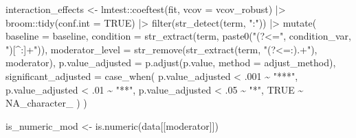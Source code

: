\documentclass[
  letterpaper,
  DIV=11,
  numbers=noendperiod]{scrartcl}
\newenvironment{Shaded}{\begin{snugshade}}{\end{snugshade}}
\newcommand{\AttributeTok}[1]{\textcolor[rgb]{0.40,0.45,0.13}{#1}}
\newcommand{\ConstantTok}[1]{\textcolor[rgb]{0.56,0.35,0.01}{#1}}
\newcommand{\DecValTok}[1]{\textcolor[rgb]{0.68,0.00,0.00}{#1}}
\newcommand{\FunctionTok}[1]{\textcolor[rgb]{0.28,0.35,0.67}{#1}}
\newcommand{\NormalTok}[1]{\textcolor[rgb]{0.00,0.23,0.31}{#1}}
\newcommand{\OtherTok}[1]{\textcolor[rgb]{0.00,0.23,0.31}{#1}}
\newcommand{\SpecialCharTok}[1]{\textcolor[rgb]{0.37,0.37,0.37}{#1}}
\newcommand{\StringTok}[1]{\textcolor[rgb]{0.13,0.47,0.30}{#1}}
\begin{document}
\begin{Shaded}
\begin{Highlighting}[]
\NormalTok{  interaction\_effects }\OtherTok{\textless{}{-}}\NormalTok{ lmtest}\SpecialCharTok{::}\FunctionTok{coeftest}\NormalTok{(fit, }\AttributeTok{vcov =}\NormalTok{ vcov\_robust) }\SpecialCharTok{|\textgreater{}}
\NormalTok{    broom}\SpecialCharTok{::}\FunctionTok{tidy}\NormalTok{(}\AttributeTok{conf.int =} \ConstantTok{TRUE}\NormalTok{) }\SpecialCharTok{|\textgreater{}}
    \FunctionTok{filter}\NormalTok{(}\FunctionTok{str\_detect}\NormalTok{(term, }\StringTok{":"}\NormalTok{)) }\SpecialCharTok{|\textgreater{}}
    \FunctionTok{mutate}\NormalTok{(}
      \AttributeTok{baseline             =}\NormalTok{ baseline,}
      \AttributeTok{condition            =} \FunctionTok{str\_extract}\NormalTok{(term, }\FunctionTok{paste0}\NormalTok{(}\StringTok{"(?\textless{}="}\NormalTok{, condition\_var, }\StringTok{")[\^{}:]+"}\NormalTok{)),}
      \AttributeTok{moderator\_level      =} \FunctionTok{str\_remove}\NormalTok{(}\FunctionTok{str\_extract}\NormalTok{(term, }\StringTok{"(?\textless{}=:).+"}\NormalTok{), moderator),}
      \AttributeTok{p.value\_adjusted     =} \FunctionTok{p.adjust}\NormalTok{(p.value, }\AttributeTok{method =}\NormalTok{ adjust\_method),}
      \AttributeTok{significant\_adjusted =} \FunctionTok{case\_when}\NormalTok{(}
\NormalTok{        p.value\_adjusted }\SpecialCharTok{\textless{}}\NormalTok{ .}\DecValTok{001} \SpecialCharTok{\textasciitilde{}} \StringTok{"***"}\NormalTok{,}
\NormalTok{        p.value\_adjusted }\SpecialCharTok{\textless{}}\NormalTok{ .}\DecValTok{01}  \SpecialCharTok{\textasciitilde{}} \StringTok{"**"}\NormalTok{,}
\NormalTok{        p.value\_adjusted }\SpecialCharTok{\textless{}}\NormalTok{ .}\DecValTok{05}  \SpecialCharTok{\textasciitilde{}} \StringTok{"*"}\NormalTok{,}
        \ConstantTok{TRUE}                    \SpecialCharTok{\textasciitilde{}} \ConstantTok{NA\_character\_}
\NormalTok{      )}
\NormalTok{    )}
  
\NormalTok{  is\_numeric\_mod }\OtherTok{\textless{}{-}} \FunctionTok{is.numeric}\NormalTok{(data[[moderator]])}
  

\end{Highlighting}
\end{Shaded}
\end{document}
